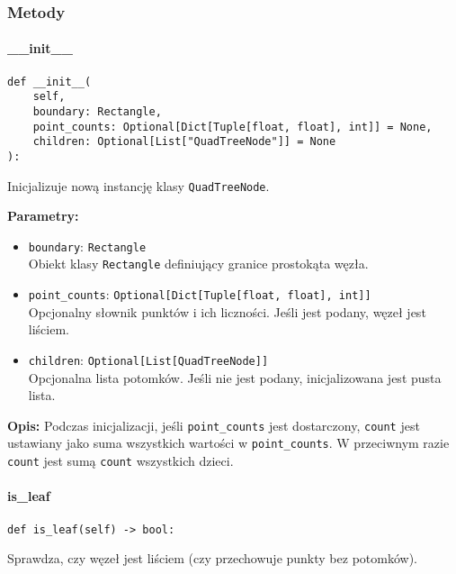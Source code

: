 \documentclass[12pt]{article}
\begin{document}
\subsubsection{Metody}

\paragraph{\_\_init\_\_}

\begin{verbatim}
def __init__(
    self,
    boundary: Rectangle,
    point_counts: Optional[Dict[Tuple[float, float], int]] = None,
    children: Optional[List["QuadTreeNode"]] = None
):
\end{verbatim}

\noindent Inicjalizuje nową instancję klasy \texttt{QuadTreeNode}.

\noindent\textbf{Parametry:}
\begin{itemize}
    \item \texttt{boundary}: \texttt{Rectangle} \\
    Obiekt klasy \texttt{Rectangle} definiujący granice prostokąta węzła.
    
    \item \texttt{point\_counts}: \texttt{Optional[Dict[Tuple[float, float], int]]} \\
    Opcjonalny słownik punktów i ich liczności. Jeśli jest podany, węzeł jest liściem.
    
    \item \texttt{children}: \texttt{Optional[List[QuadTreeNode]]} \\
    Opcjonalna lista potomków. Jeśli nie jest podany, inicjalizowana jest pusta lista.
\end{itemize}

\textbf{Opis:}
Podczas inicjalizacji, jeśli \texttt{point\_counts} jest dostarczony, \texttt{count} jest ustawiany jako suma wszystkich wartości w \texttt{point\_counts}. W przeciwnym razie \texttt{count} jest sumą \texttt{count} wszystkich dzieci.

\paragraph{is\_leaf}

\begin{verbatim}
def is_leaf(self) -> bool:
\end{verbatim}

\noindent Sprawdza, czy węzeł jest liściem (czy przechowuje punkty bez potomków).
\end{document}
